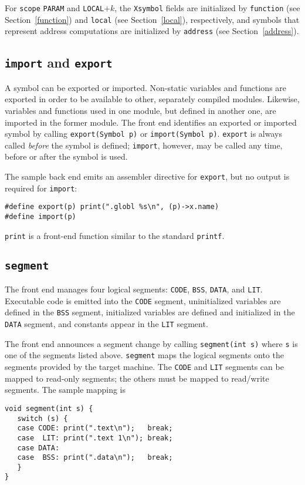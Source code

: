 For \verb|scope| \verb|PARAM| and  \verb|LOCAL|$+k$,
the \verb|Xsymbol| fields are initialized
by \verb|function| (see Section~\ref{function})
and \verb|local| (see Section~\ref{local}), respectively,
and symbols that represent address computations
are initialized by \verb|address| (see Section~\ref{address}).

\subsection{{\tt import} and \tt export}

\label{import}\label{export}
A symbol can be exported or imported.
Non-static variables and functions are exported
in order to be available to other,
separately compiled modules. Likewise, variables and functions used
in one module, but defined in another one, are imported
in the former module.
The front end identifies an exported or imported symbol
by calling \verb|export(Symbol p)| or \verb|import(Symbol p)|. \verb|export|
is always called {\em before} the symbol is defined;
\verb|import|, however, may be called any time, before or after the symbol
is used.

The sample back end emits an assembler directive for \verb|export|,
but no output is required for \verb|import|:
\begin{verbatim}
#define export(p) print(".globl %s\n", (p)->x.name)
#define import(p)
\end{verbatim}
\verb|print| is a front-end function similar to the standard \verb|printf|.

\subsection{\tt segment}

\label{segment}
The front end manages four logical segments:
\verb|CODE|, \verb|BSS|, \verb|DATA|, and \verb|LIT|.
Executable code is emitted into the \verb|CODE| segment,
uninitialized variables are defined in the \verb|BSS| segment,
initialized variables are defined and initialized in the \verb|DATA| segment,
and constants appear in the \verb|LIT| segment.

The front end announces a segment change by calling
\verb|segment(int s)| where \verb|s| is one of the segments listed above.
\verb|segment| maps the logical segments onto the segments
provided by the target machine. The \verb|CODE| and \verb|LIT| segments
can be mapped to read-only segments; the others must be mapped to read/write segments.
The sample mapping is
\begin{verbatim}
void segment(int s) {
   switch (s) {
   case CODE: print(".text\n");   break;
   case  LIT: print(".text 1\n"); break;
   case DATA:
   case  BSS: print(".data\n");   break;
   }
}
\end{verbatim}

